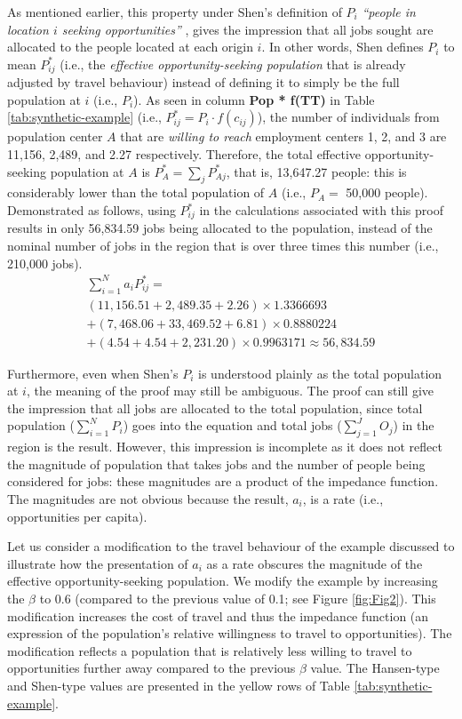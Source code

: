 \documentclass[10pt,letterpaper]{article}
\begin{document}
As mentioned earlier, this property under Shen's definition of \(P_i\)
\emph{``people in location \(i\) seeking opportunities''} , gives the
impression that all jobs sought are allocated to the people located at
each origin \(i\). In other words, Shen defines \(P_i\) to mean
\(P_{ij}^*\) (i.e., the \emph{effective opportunity-seeking population}
that is already adjusted by travel behaviour) instead of defining it to
simply be the full population at \(i\) (i.e., \(P_i\)). As seen in
column \textbf{Pop * f(TT)} in Table \ref{tab:synthetic-example} (i.e.,
\(P_{ij}^* = P_i\cdot f(c_{ij})\)), the number of individuals from
population center \(A\) that are \emph{willing to reach} employment
centers 1, 2, and 3 are 11,156, 2,489, and 2.27 respectively. Therefore,
the total effective opportunity-seeking population at \(A\) is
\(P_A^* = \sum_jP_{Aj}^*\), that is, 13,647.27 people: this is
considerably lower than the total population of \(A\) (i.e., \(P_A=\)
50,000 people). Demonstrated as follows, using \(P_{ij}^*\) in the
calculations associated with this proof results in only 56,834.59 jobs
being allocated to the population, instead of the nominal number of jobs
in the region that is over three times this number (i.e., 210,000 jobs).
\[
\begin{array}{l}
\sum_{i=1}^N a_{i} P_{ij}^* =\\
(11,156.51 + 2,489.35 + 2.26)\times 1.3366693 \\
+ (7,468.06 + 33,469.52 + 6.81)\times 0.8880224\\
+ (4.54 + 4.54 + 2,231.20)\times 0.9963171 \approx 56,834.59
\end{array}
\]

Furthermore, even when Shen's \(P_i\) is understood plainly as the total
population at \(i\), the meaning of the proof may still be ambiguous.
The proof can still give the impression that all jobs are allocated to
the total population, since total population (\(\sum_{i=1}^N P_i\)) goes
into the equation and total jobs (\(\sum_{j=1}^JO_j\)) in the region is
the result. However, this impression is incomplete as it does not
reflect the magnitude of population that takes jobs and the number of
people being considered for jobs: these magnitudes are a product of the
impedance function. The magnitudes are not obvious because the result,
\(a_i\), is a rate (i.e., opportunities per capita).

Let us consider a modification to the travel behaviour of the example
discussed to illustrate how the presentation of \(a_i\) as a rate
obscures the magnitude of the effective opportunity-seeking population.
We modify the example by increasing the \(\beta\) to 0.6 (compared to
the previous value of 0.1; see Figure \ref{fig:Fig2}). This modification
increases the cost of travel and thus the impedance function (an
expression of the population's relative willingness to travel to
opportunities). The modification reflects a population that is
relatively less willing to travel to opportunities further away compared
to the previous \(\beta\) value. The Hansen-type and Shen-type values
are presented in the yellow rows of Table \ref{tab:synthetic-example}.
\end{document}

